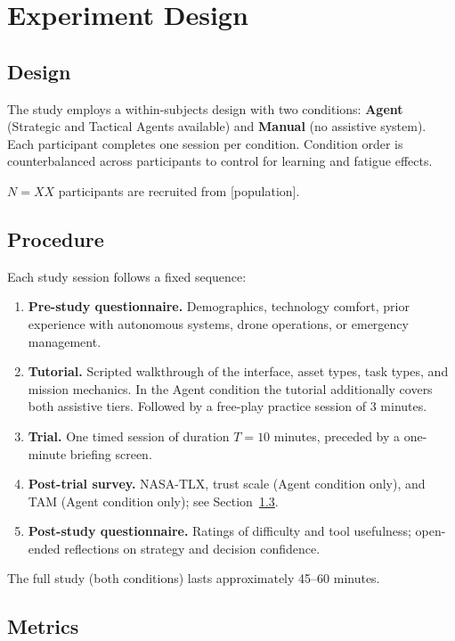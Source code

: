 \documentclass[10pt]{article}
\theoremstyle{definition}
\begin{document}
\section{Experiment Design}\label{sec:studydesign}

\subsection{Design}

The study employs a within-subjects design with two conditions: \textbf{Agent} (Strategic and Tactical Agents available) and \textbf{Manual} (no assistive system). Each participant completes one session per condition. Condition order is counterbalanced across participants to control for learning and fatigue effects.

$N = XX$ participants are recruited from [population].

\subsection{Procedure}

Each study session follows a fixed sequence:
\begin{enumerate}[noitemsep]
  \item \textbf{Pre-study questionnaire.} Demographics, technology comfort, prior experience with autonomous systems, drone operations, or emergency management.
  \item \textbf{Tutorial.} Scripted walkthrough of the interface, asset types, task types, and mission mechanics. In the Agent condition the tutorial additionally covers both assistive tiers. Followed by a free-play practice session of 3 minutes.
  \item \textbf{Trial.} One timed session of duration $T = 10$ minutes, preceded by a one-minute briefing screen.
  \item \textbf{Post-trial survey.} NASA-TLX, trust scale (Agent condition only), and TAM (Agent condition only); see Section~\ref{sec:metrics}.
  \item \textbf{Post-study questionnaire.} Ratings of difficulty and tool usefulness; open-ended reflections on strategy and decision confidence.
\end{enumerate}

The full study (both conditions) lasts approximately 45--60 minutes.

\subsection{Metrics}\label{sec:metrics}
\end{document}
